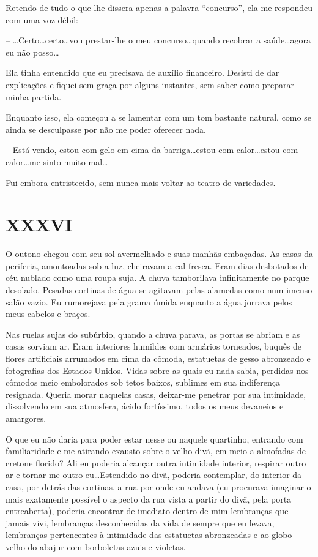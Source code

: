 Retendo de tudo o que lhe dissera apenas a palavra ``concurso'', ela me respondeu com uma voz débil:

-- \dots Certo\dots certo\dots vou prestar-lhe o meu concurso\dots quando recobrar a saúde\dots agora eu não posso\dots

Ela tinha entendido que eu precisava de auxílio financeiro. Desisti de dar explicações e fiquei sem graça por alguns instantes, sem saber como preparar minha partida.

Enquanto isso, ela começou a se lamentar com um tom bastante natural, como se ainda se desculpasse por não me poder oferecer nada.

-- Está vendo, estou com gelo em cima da barriga\dots estou com calor\dots estou com calor\dots me sinto muito mal\dots

Fui embora entristecido, sem nunca mais voltar ao teatro de variedades.


\chapter*{\centering\Large{XXXVI}}

O outono chegou com seu sol avermelhado e suas manhãs embaçadas. As casas da periferia, amontoadas sob a luz, cheiravam a cal fresca. Eram dias desbotados de céu nublado como uma roupa suja. A chuva tamborilava infinitamente no parque desolado. Pesadas cortinas de água se agitavam pelas alamedas como num imenso salão vazio. Eu rumorejava pela grama úmida enquanto a água jorrava pelos meus cabelos e braços.

Nas ruelas sujas do subúrbio, quando a chuva parava, as portas se abriam e as casas sorviam ar. Eram interiores humildes com armários torneados, buquês de flores artificiais arrumados em cima da cômoda, estatuetas de gesso abronzeado e fotografias dos Estados Unidos. Vidas sobre as quais eu nada sabia, perdidas nos cômodos meio embolorados sob tetos baixos, sublimes em sua indiferença resignada.
Queria morar naquelas casas, deixar-me penetrar por sua intimidade, dissolvendo em sua atmosfera, ácido fortíssimo, todos os meus devaneios e amargores.

O que eu não daria para poder estar nesse ou naquele quartinho, entrando com familiaridade e me atirando exausto sobre o velho divã, em meio a almofadas de cretone florido? Ali eu poderia alcançar outra intimidade interior, respirar outro ar e tornar-me outro eu\dots Estendido no divã, poderia contemplar, do interior da casa, por detrás das cortinas, a rua por onde eu andava (eu procurava imaginar o mais exatamente possível o aspecto da rua vista a partir do divã, pela porta entreaberta), poderia encontrar de imediato dentro de mim lembranças que jamais vivi, lembranças desconhecidas da vida de sempre que eu levava, lembranças pertencentes à intimidade das estatuetas abronzeadas e ao globo velho do abajur com borboletas azuis e violetas.

